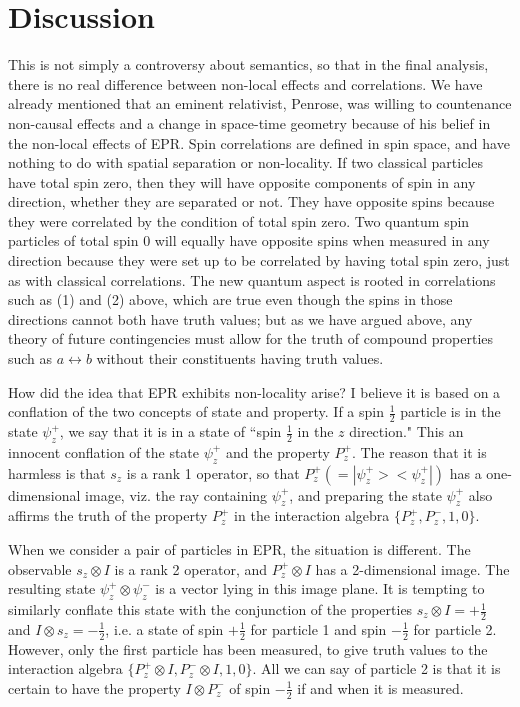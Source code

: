 \documentclass{article}
\begin{document}
\section*{Discussion}
This is not simply a controversy about semantics, so that in the final analysis, there is no real difference between non-local effects and correlations. We have already mentioned that an eminent relativist, Penrose, was willing to countenance non-causal effects and a change in space-time geometry because of his belief in the non-local effects of EPR. Spin correlations are defined in spin space, and have nothing to do with spatial separation or non-locality. If two classical particles have total spin zero, then they will have opposite components of spin in any direction, whether they are separated or not. They have opposite spins because they were correlated by the condition of total spin zero. Two quantum spin particles of total spin 0 will equally have opposite spins when measured in any direction because they were set up to be correlated by having total spin zero, just as with classical correlations. The new quantum aspect is rooted in correlations such as (1) and (2) above, which are true even though the spins in those directions cannot both have truth values; but as we have argued above, any theory of future contingencies must allow for the truth of compound properties such as  $a\leftrightarrow b$ without their constituents having truth values.

How did the idea that EPR exhibits non-locality arise? I believe it is based on a conflation of the two concepts of state and property. If a spin $\frac{1}{2}$ particle is in the state $\psi_z^+$, we say that it is in a state of ``spin $\frac{1}{2}$ in the $z$ direction." This an innocent conflation of the state $\psi_z^+$ and the property $P_z^+.$   The reason that it is harmless  is that $s_z$ is a rank 1 operator, so that $P_z^+(= |\psi_z^+ >< \psi_z^+|)$ has a one-dimensional image, viz. the ray containing $\psi_z^+$, and preparing the state $\psi_z^+$ also affirms the truth of the property $P_z^+$ in the interaction algebra $\{ P_z^+, P_z^-, 1, 0\}$.

When we consider a pair of particles in EPR, the situation is different. The observable $s_z\otimes I$ is a rank 2 operator, and $P_z^+\otimes I$  has a 2-dimensional image. The resulting state $\psi_z^+\otimes\psi_z^-$ is a vector lying in this image plane. It is tempting to similarly conflate this state with the conjunction of the properties $s_z\otimes I  =  +\frac{1}{2}$ and $I\otimes s_z = -\frac{1}{2}$, i.e. a state of spin $+\frac{1}{2}$  for particle 1 and spin $-\frac{1}{2}$ for particle 2. However, only the first particle has been measured, to give truth values to the interaction algebra $\{ P_z^+\otimes I, P_z^-\otimes I, 1, 0\}.$ All we can say of particle 2 is that it is certain to have the property $I\otimes  P_z^-$ of spin $-\frac{1}{2}$ if and when it is measured.  
\end{document}
